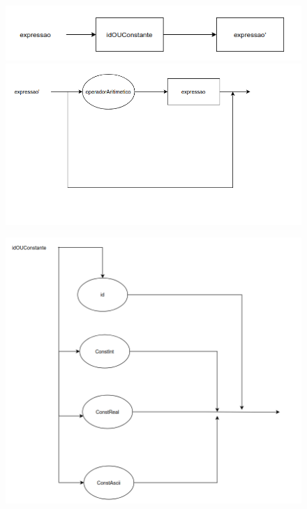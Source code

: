 \documentclass[11pt]{article}
\begin{document}
\newpage


\begin{figure}[H]
    \includegraphics[scale=2.0]{grafos_sintaticos/expressao.png}

    \includegraphics[scale=2.0]{grafos_sintaticos/expressao'.png}

\end{figure}

\newpage

\begin{figure}[H]
    \includegraphics[scale=1.1]{grafos_sintaticos/id_ou_constante.png}

\end{figure}
\end{document}
